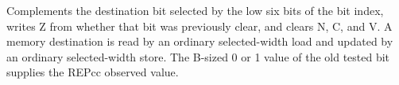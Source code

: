 Complements the destination bit selected by the low six bits of the bit index, writes Z from whether that bit was previously clear, and clears N, C, and V. A memory destination is read by an ordinary selected-width load and updated by an ordinary selected-width store. The B-sized 0 or 1 value of the old tested bit supplies the REPcc observed value.
